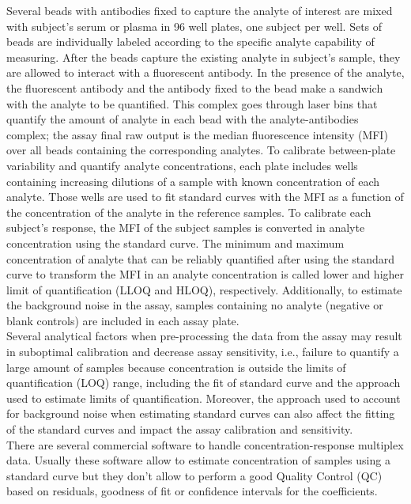 \documentclass[11pt]{article}\usepackage[]{graphicx}\usepackage[]{color}
\begin{document}
\noindent Several beads with antibodies fixed to capture the analyte of interest are mixed with subject's serum or plasma in 96 well plates, one subject per well. Sets of beads are individually labeled according to the specific analyte capability of measuring. After the beads capture the existing analyte in subject's sample, they are allowed to interact with a fluorescent antibody. In the presence of the analyte, the fluorescent antibody and the antibody fixed to the bead make a sandwich with the analyte to be quantified. This complex goes through laser bins that quantify the amount of analyte in each bead with the analyte-antibodies complex; the assay final raw output is the median fluorescence intensity (MFI) over all beads containing the corresponding analytes. To calibrate between-plate variability and quantify analyte concentrations, each plate includes wells containing increasing dilutions of a sample with known concentration of each analyte. Those wells are used to fit standard curves with the MFI as a function of the concentration of the analyte in the reference samples. To calibrate each subject's response, the MFI of the subject samples is converted in analyte concentration using the standard curve. The minimum and maximum concentration of analyte that can be reliably quantified after using the standard curve to transform the MFI in an analyte concentration is called lower and higher limit of quantification (LLOQ and HLOQ), respectively. Additionally, to estimate the background noise in the assay, samples containing no analyte (negative or blank controls) are included in each assay plate.\\

\noindent Several analytical factors when pre-processing the data from the assay may result in suboptimal calibration and decrease assay sensitivity, i.e., failure to quantify a large amount of samples because concentration is outside the limits of quantification (LOQ) range, including the fit of standard curve and the approach used to estimate limits of quantification. Moreover, the approach used to account for background noise when estimating standard curves can also affect the fitting of the standard curves and impact the assay calibration and sensitivity. \\


\noindent There are several commercial software to handle 
concentration-response multiplex data. Usually these software 
allow to estimate concentration of samples using a standard curve but 
they don't allow to perform a good Quality Control (QC) based on residuals, 
goodness of fit or confidence intervals for the coefficients. \\
\end{document}
